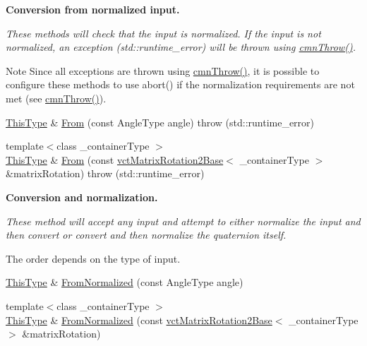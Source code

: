\begin{Indent}{\bf Conversion from normalized input.}\par
{\em These methods will check that the input is normalized. If the input is not normalized, an exception ({\ttfamily std\-::runtime\-\_\-error}) will be thrown using \hyperlink{_minimal_cmn_8h_ad50e82cf9c9dbd0e6443c13e0d1a6f1a}{cmn\-Throw()}.

\begin{DoxyNote}{Note}
Since all exceptions are thrown using \hyperlink{_minimal_cmn_8h_ad50e82cf9c9dbd0e6443c13e0d1a6f1a}{cmn\-Throw()}, it is possible to configure these methods to use {\ttfamily abort()} if the normalization requirements are not met (see \hyperlink{_minimal_cmn_8h_ad50e82cf9c9dbd0e6443c13e0d1a6f1a}{cmn\-Throw()}). 
\end{DoxyNote}
}\begin{DoxyCompactItemize}
\item 
\hyperlink{classvct_angle_rotation2_a67339254f084f89c13aca70c1242d18e}{This\-Type} \& \hyperlink{classvct_angle_rotation2_a831a44a42d74add50de6b0cf38c13087}{From} (const Angle\-Type angle)  throw (std\-::runtime\-\_\-error)
\item 
{\footnotesize template$<$class \-\_\-container\-Type $>$ }\\\hyperlink{classvct_angle_rotation2_a67339254f084f89c13aca70c1242d18e}{This\-Type} \& \hyperlink{classvct_angle_rotation2_aa8de8e2af514ae8424db82f3ccb2225f}{From} (const \hyperlink{classvct_matrix_rotation2_base}{vct\-Matrix\-Rotation2\-Base}$<$ \-\_\-container\-Type $>$ \&matrix\-Rotation)  throw (std\-::runtime\-\_\-error)
\end{DoxyCompactItemize}
\end{Indent}
\begin{Indent}{\bf Conversion and normalization.}\par
{\em These method will accept any input and attempt to either normalize the input and then convert or convert and then normalize the quaternion itself.\par
The order depends on the type of input. }\begin{DoxyCompactItemize}
\item 
\hyperlink{classvct_angle_rotation2_a67339254f084f89c13aca70c1242d18e}{This\-Type} \& \hyperlink{classvct_angle_rotation2_ae7c2f016b94543789c29ad53cbf256b7}{From\-Normalized} (const Angle\-Type angle)
\item 
{\footnotesize template$<$class \-\_\-container\-Type $>$ }\\\hyperlink{classvct_angle_rotation2_a67339254f084f89c13aca70c1242d18e}{This\-Type} \& \hyperlink{classvct_angle_rotation2_a20529e684275cd15b864eab7984f69de}{From\-Normalized} (const \hyperlink{classvct_matrix_rotation2_base}{vct\-Matrix\-Rotation2\-Base}$<$ \-\_\-container\-Type $>$ \&matrix\-Rotation)
\end{DoxyCompactItemize}
\end{Indent}
